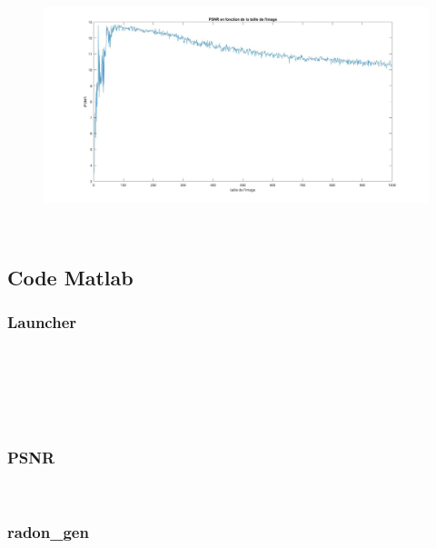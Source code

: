 \documentclass[conference]{IEEEtran}
\begin{document}
\newpage $ $
\begin{figure}[H]
\centering
\includegraphics[scale=0.42, angle=-90]{PSNR3}
\label{fig:gallery}
\end{figure}

\newpage $ $
\newpage

\subsection{Code Matlab}

\subsubsection{Launcher }

\begin{figure}[H]
\centering

\label{fig:gallery}
\end{figure}
\newpage $ $
\newpage

\begin{figure}[H]
\centering

\label{fig:gallery}
\end{figure}
\newpage $ $
\newpage

\begin{figure}[H]
\centering

\label{fig:gallery}
\end{figure}
\newpage $ $
\newpage

\subsubsection{PSNR }
\begin{figure}[H]
\centering

\label{fig:gallery}
\end{figure}
\newpage $ $
\newpage

\subsubsection{radon\_gen }
\begin{figure}[H]
\centering

\label{fig:gallery}
\end{figure}
\newpage $ $
\newpage
\end{document}

